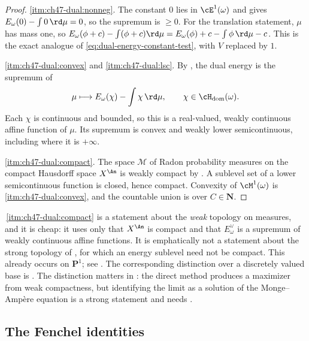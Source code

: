 \begin{proof}
\cref{itm:ch47-dual:nonneg}.  The constant $0$ lies in
$\cE^1(\omega)$ and gives $E_\omega(0)-\int0\,\rd\mu=0$, so the
supremum is $\ge0$.  For the translation statement, $\mu$ has mass one,
so $E_\omega(\phi+c)-\int(\phi+c)\rd\mu
=E_\omega(\phi)+c-\int\phi\,\rd\mu-c$.  This is the exact analogue of
\eqref{eq:dual-energy-constant-test}, with $V$ replaced by $1$.

\cref{itm:ch47-dual:convex} and \cref{itm:ch47-dual:lsc}.
By , the dual energy is the supremum of
\[
 \mu\longmapsto E_\omega(\chi)-\int\chi\,\rd\mu,
 \qquad \chi\in\cH_{\mathrm{dom}}(\omega).
\]
Each $\chi$ is continuous and bounded, so this is a real-valued,
weakly continuous affine function of $\mu$. Its supremum is convex
and weakly lower semicontinuous, including where it is $+\infty$.

\cref{itm:ch47-dual:compact}.  The space $\mathcal M$ of Radon
probability measures on the compact Hausdorff space $X^{\An}$ is weakly
compact by .  A sublevel set of a
lower semicontinuous function is closed, hence compact.  Convexity of
$\cM^1(\omega)$ is \cref{itm:ch47-dual:convex}, and the countable union is
over $C\in\mathbf N$.
\end{proof}

\begin{remark}
\label{rem:ch47-weak-not-strong}
\,\cref{itm:ch47-dual:compact} is a
statement about the \emph{weak} topology on measures, and it is cheap: it
uses only that $X^{\An}$ is compact and that $E^\vee_\omega$ is a
supremum of weakly continuous affine functions.  It is emphatically not a
statement about the strong topology of
, for which an energy sublevel need not be compact. This already occurs
on $\mathbf P^1$; see . The corresponding
distinction over a discretely valued base is
.  The distinction matters in : the direct
method produces a maximizer from weak compactness, but identifying the
limit as a solution of the Monge--Amp\`ere equation is a strong statement
and needs .
\end{remark}

\subsection{The Fenchel identities}
\label{sec:ch47-fenchel}

